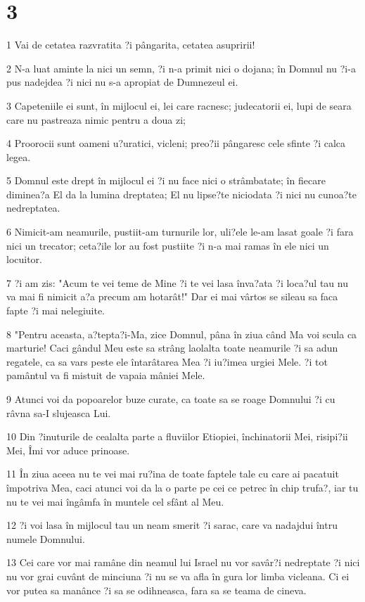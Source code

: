\chapter{3}

\par 1 Vai de cetatea razvratita ?i pângarita, cetatea asupririi!
\par 2 N-a luat aminte la nici un semn, ?i n-a primit nici o dojana; în Domnul nu ?i-a pus nadejdea ?i nici nu s-a apropiat de Dumnezeul ei.
\par 3 Capeteniile ei sunt, în mijlocul ei, lei care racnesc; judecatorii ei, lupi de seara care nu pastreaza nimic pentru a doua zi;
\par 4 Proorocii sunt oameni u?uratici, vicleni; preo?ii pângaresc cele sfinte ?i calca legea.
\par 5 Domnul este drept în mijlocul ei ?i nu face nici o strâmbatate; în fiecare diminea?a El da la lumina dreptatea; El nu lipse?te niciodata ?i nici nu cunoa?te nedreptatea.
\par 6 Nimicit-am neamurile, pustiit-am turnurile lor, uli?ele le-am lasat goale ?i fara nici un trecator; ceta?ile lor au fost pustiite ?i n-a mai ramas în ele nici un locuitor.
\par 7 ?i am zis: "Acum te vei teme de Mine ?i te vei lasa înva?ata ?i loca?ul tau nu va mai fi nimicit a?a precum am hotarât!" Dar ei mai vârtos se sileau sa faca fapte ?i mai nelegiuite.
\par 8 "Pentru aceasta, a?tepta?i-Ma, zice Domnul, pâna în ziua când Ma voi scula ca marturie! Caci gândul Meu este sa strâng laolalta toate neamurile ?i sa adun regatele, ca sa vars peste ele întarâtarea Mea ?i iu?imea urgiei Mele. ?i tot pamântul va fi mistuit de vapaia mâniei Mele.
\par 9 Atunci voi da popoarelor buze curate, ca toate sa se roage Domnului ?i cu râvna sa-I slujeasca Lui.
\par 10 Din ?inuturile de cealalta parte a fluviilor Etiopiei, închinatorii Mei, risipi?ii Mei, Îmi vor aduce prinoase.
\par 11 În ziua aceea nu te vei mai ru?ina de toate faptele tale cu care ai pacatuit împotriva Mea, caci atunci voi da la o parte pe cei ce petrec în chip trufa?, iar tu nu te vei mai îngâmfa în muntele cel sfânt al Meu.
\par 12 ?i voi lasa în mijlocul tau un neam smerit ?i sarac, care va nadajdui întru numele Domnului.
\par 13 Cei care vor mai ramâne din neamul lui Israel nu vor savâr?i nedreptate ?i nici nu vor grai cuvânt de minciuna ?i nu se va afla în gura lor limba vicleana. Ci ei vor putea sa manânce ?i sa se odihneasca, fara sa se teama de cineva.
